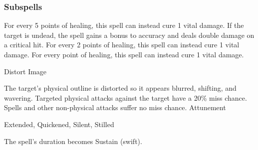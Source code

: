 \subsubsection{Subspells}
For every 5 points of healing, this spell can instead cure 1 vital damage.
If the target is undead, the spell gains a  bonus to accuracy and deals double damage on a critical hit.
For every 2 points of healing, this spell can instead cure 1 vital damage.
For every point of healing, this spell can instead cure 1 vital damage.
\begin{spellsection}{Distort Image}
\begin{spellcontent}
\begin{spelltargetinginfo}
\end{spelltargetinginfo}
\begin{spelleffects}
\spelleffect
The target's physical outline is distorted so it appears blurred, shifting, and wavering.
Targeted physical attacks against the target have a 20\% miss chance.
Spells and other non-physical attacks suffer no miss chance.
\spelldur Attunement
\end{spelleffects}
\end{spellcontent}
\begin{spellfooter}
 Extended, Quickened, Silent, Stilled
\end{spellfooter}
\begin{spellsubcontent}
\begin{spellcantrip}
The spell's duration becomes Sustain (swift).
\end{spellcantrip}
\end{spellsubcontent}
\end{spellsection}
